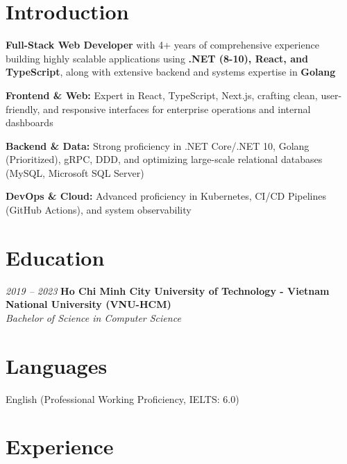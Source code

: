 \section{Introduction}
\begin{onecolentry}
    \begin{highlights}
        \item \textbf{Full-Stack Web Developer} with 4+ years of comprehensive experience building highly scalable applications using \textbf{.NET (8-10), React, and TypeScript}, along with extensive backend and systems expertise in \textbf{Golang}
        \item \textbf{Frontend \& Web:} Expert in React, TypeScript, Next.js, crafting clean, user-friendly, and responsive interfaces for enterprise operations and internal dashboards
        \item \textbf{Backend \& Data:} Strong proficiency in .NET Core/.NET 10, Golang (Prioritized), gRPC, DDD, and optimizing large-scale relational databases (MySQL, Microsoft SQL Server)
        \item \textbf{DevOps \& Cloud:} Advanced proficiency in Kubernetes, CI/CD Pipelines (GitHub Actions), and system observability
    \end{highlights}
\end{onecolentry}

\section{Education}
\begin{twocolentry}{\textit{2019 -- 2023}}
    \textbf{Ho Chi Minh City University of Technology - Vietnam National University (VNU-HCM)}\\[4pt]
    \textit{Bachelor of Science in Computer Science}
\end{twocolentry}

\section{Languages}
\begin{onecolentry}
    \begin{highlights}
        \item English (Professional Working Proficiency, IELTS: 6.0)
    \end{highlights}
\end{onecolentry}

\section{Experience}

